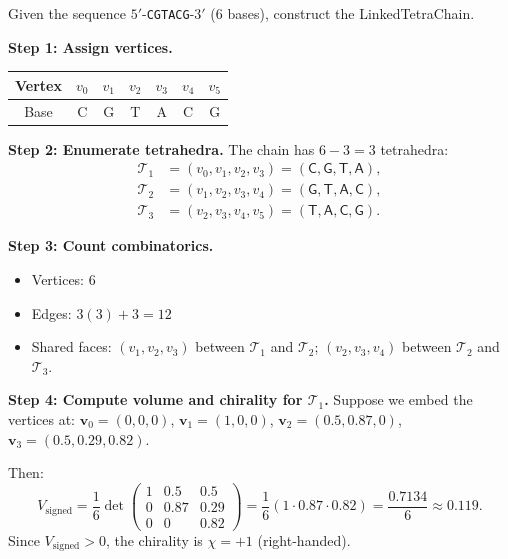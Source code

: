 \begin{example}
\label{ex:build-chain}
Given the sequence $5'$-\texttt{CGTACG}-$3'$ (6 bases), construct the
LinkedTetraChain.

\textbf{Step 1: Assign vertices.}
\begin{center}
\begin{tabular}{ccccccc}
\toprule
Vertex & $v_0$ & $v_1$ & $v_2$ & $v_3$ & $v_4$ & $v_5$ \\
\midrule
Base & C & G & T & A & C & G \\
\bottomrule
\end{tabular}
\end{center}

\textbf{Step 2: Enumerate tetrahedra.}
The chain has $6 - 3 = 3$ tetrahedra:
\begin{align*}
  \mathcal{T}_1 &= (v_0, v_1, v_2, v_3) = (\textsf{C}, \textsf{G}, \textsf{T}, \textsf{A}), \\
  \mathcal{T}_2 &= (v_1, v_2, v_3, v_4) = (\textsf{G}, \textsf{T}, \textsf{A}, \textsf{C}), \\
  \mathcal{T}_3 &= (v_2, v_3, v_4, v_5) = (\textsf{T}, \textsf{A}, \textsf{C}, \textsf{G}).
\end{align*}

\textbf{Step 3: Count combinatorics.}
\begin{itemize}[leftmargin=1.5em]
  \item Vertices: 6
  \item Edges: $3(3) + 3 = 12$
  \item Shared faces: $(v_1,v_2,v_3)$ between $\mathcal{T}_1$ and $\mathcal{T}_2$;
        $(v_2,v_3,v_4)$ between $\mathcal{T}_2$ and $\mathcal{T}_3$.
\end{itemize}

\textbf{Step 4: Compute volume and chirality for $\mathcal{T}_1$.}
Suppose we embed the vertices at:
$\mathbf{v}_0 = (0,0,0)$, $\mathbf{v}_1 = (1,0,0)$,
$\mathbf{v}_2 = (0.5, 0.87, 0)$, $\mathbf{v}_3 = (0.5, 0.29, 0.82)$.

Then:
\[
  V_{\text{signed}} = \frac{1}{6} \det \begin{pmatrix}
    1 & 0.5 & 0.5 \\
    0 & 0.87 & 0.29 \\
    0 & 0 & 0.82
  \end{pmatrix}
  = \frac{1}{6}(1 \cdot 0.87 \cdot 0.82) = \frac{0.7134}{6} \approx 0.119.
\]
Since $V_{\text{signed}} > 0$, the chirality is $\chi = +1$ (right-handed).
\end{example}

